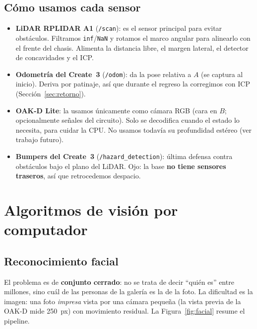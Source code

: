 \documentclass[11pt,a4paper]{article}
\newcommand{\cmd}[1]{\texttt{\small #1}}
\begin{document}
\subsection{C\'omo usamos cada sensor}
\begin{itemize}
\item \textbf{LiDAR RPLIDAR A1} (\cmd{/scan}): es el sensor principal para evitar obst\'aculos. Filtramos \texttt{inf}/\texttt{NaN} y rotamos el marco
angular para alinearlo con el frente del chasis. Alimenta la distancia libre, el margen lateral, el detector de concavidades y el ICP.
\item \textbf{Odometr\'ia del Create~3} (\cmd{/odom}): da la pose relativa a $A$ (se captura al inicio). Deriva por patinaje, as\'i que durante el
regreso la corregimos con ICP (Secci\'on~\ref{sec:retorno}).
\item \textbf{OAK-D Lite}: la usamos \'unicamente como c\'amara RGB (cara en $B$; opcionalmente se\~nales del circuito). Solo se decodifica cuando el estado
lo necesita, para cuidar la CPU. No usamos todav\'ia su profundidad est\'ereo (ver trabajo futuro).
\item \textbf{Bumpers del Create~3} (\cmd{/hazard\_detection}): \'ultima defensa contra obst\'aculos bajo el plano del LiDAR. Ojo: la base \textbf{no tiene
sensores traseros}, as\'i que retrocedemos despacio.
\end{itemize}

\section{Algoritmos de visi\'on por computador}
\label{sec:vision}
\subsection{Reconocimiento facial}
\label{sec:facial}
El problema es de \textbf{conjunto cerrado}: no se trata de decir ``qui\'en es'' entre millones, sino cu\'al de las personas de la galer\'ia es la de la foto.
La dificultad es la imagen: una foto \emph{impresa} vista por una c\'amara peque\~na (la vista previa de la OAK-D mide 250~px) con movimiento
residual. La Figura~\ref{fig:facial} resume el pipeline.
\end{document}
